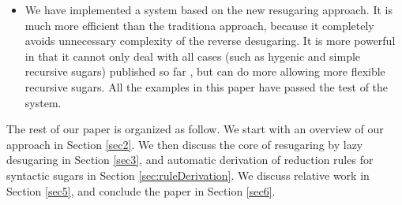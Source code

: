 \begin{itemize}
\item We have implemented a system based on the new resugaring approach. It is much more efficient than the traditiona approach, because it completely avoids unnecessary complexity of the reverse desugaring. It is more powerful in that it cannot only deal with all cases (such as hygenic and simple recursive sugars) published so far \cite{resugaring,hygienic}, but can do more allowing more flexible recursive sugars. All the examples in this paper have passed the test of the system.


\end{itemize}

The rest of our paper is organized as follow. We start with an overview of our approach in Section \ref{sec2}. We then discuss the core of resugaring by lazy desugaring in Section \ref{sec3}, and automatic derivation of reduction rules for syntactic sugars in Section \ref{sec:ruleDerivation}. We discuss relative work in Section \ref{sec5}, and conclude the paper in Section \ref{sec6}.

